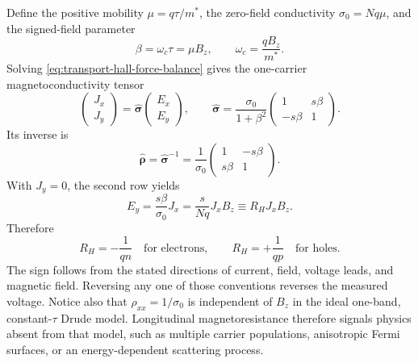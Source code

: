 Define the positive mobility $\mu=q\tau/m^*$, the zero-field conductivity
$\sigma_0=Nq\mu$, and the signed-field parameter
\begin{equation}
  \beta=\omega_c\tau=\mu B_z,
  \qquad
  \omega_c=\frac{qB_z}{m^*}.
  \label{eq:transport-hall-beta}
\end{equation}
Solving \cref{eq:transport-hall-force-balance} gives the one-carrier
magnetoconductivity tensor
\begin{equation}
  \begin{pmatrix}J_x\\J_y\end{pmatrix}
  =\hat{\bm\sigma}
  \begin{pmatrix}E_x\\E_y\end{pmatrix},
  \qquad
  \hat{\bm\sigma}
  =\frac{\sigma_0}{1+\beta^2}
  \begin{pmatrix}
    1&s\beta\\
    -s\beta&1
  \end{pmatrix}.
  \label{eq:transport-one-carrier-magnetoconductivity}
\end{equation}
Its inverse is
\begin{equation}
  \hat{\bm\rho}=\hat{\bm\sigma}^{-1}
  =\frac1{\sigma_0}
  \begin{pmatrix}
    1&-s\beta\\
    s\beta&1
  \end{pmatrix}.
  \label{eq:transport-one-carrier-magnetoresistivity}
\end{equation}
With $J_y=0$, the second row yields
\begin{equation}
  E_y=\frac{s\beta}{\sigma_0}J_x
  =\frac{s}{Nq}J_xB_z
  \equiv R_HJ_xB_z.
  \label{eq:transport-hall-field}
\end{equation}
Therefore
\begin{equation}
  \boxed{
  R_H=-\frac1{qn}\quad\text{for electrons},
  \qquad
  R_H=+\frac1{qp}\quad\text{for holes}.
  }
  \label{eq:transport-hall-coefficients}
\end{equation}
The sign follows from the stated directions of current, field, voltage leads,
and magnetic field.  Reversing any one of those conventions reverses the
measured voltage.  Notice also that
$\rho_{xx}=1/\sigma_0$ is independent of $B_z$ in the ideal one-band,
constant-$\tau$ Drude model.  Longitudinal magnetoresistance therefore signals
physics absent from that model, such as multiple carrier populations,
anisotropic Fermi surfaces, or an energy-dependent scattering process.

